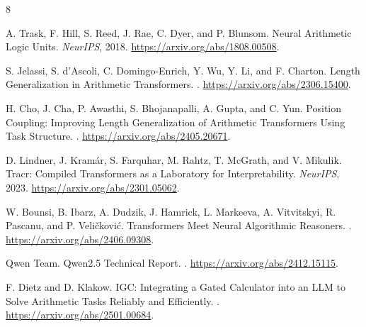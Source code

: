 \documentclass[11pt]{article}
\begin{document}
\begin{thebibliography}{8}

A. Trask, F. Hill, S. Reed, J. Rae, C. Dyer, and P. Blunsom.
\newblock Neural Arithmetic Logic Units.
\newblock \emph{NeurIPS}, 2018.
\newblock \url{https://arxiv.org/abs/1808.00508}.

S. Jelassi, S. d'Ascoli, C. Domingo-Enrich, Y. Wu, Y. Li, and F. Charton.
\newblock Length Generalization in Arithmetic Transformers.
.
\newblock \url{https://arxiv.org/abs/2306.15400}.

H. Cho, J. Cha, P. Awasthi, S. Bhojanapalli, A. Gupta, and C. Yun.
\newblock Position Coupling: Improving Length Generalization of Arithmetic
Transformers Using Task Structure.
.
\newblock \url{https://arxiv.org/abs/2405.20671}.

D. Lindner, J. Kram\'{a}r, S. Farquhar, M. Rahtz, T. McGrath, and V. Mikulik.
\newblock Tracr: Compiled Transformers as a Laboratory for Interpretability.
\newblock \emph{NeurIPS}, 2023.
\newblock \url{https://arxiv.org/abs/2301.05062}.

W. Bounsi, B. Ibarz, A. Dudzik, J. Hamrick, L. Markeeva, A. Vitvitskyi,
R. Pascanu, and P. Veli\v{c}kovi\'{c}.
\newblock Transformers Meet Neural Algorithmic Reasoners.
.
\newblock \url{https://arxiv.org/abs/2406.09308}.

Qwen Team.
\newblock Qwen2.5 Technical Report.
.
\newblock \url{https://arxiv.org/abs/2412.15115}.

F. Dietz and D. Klakow.
\newblock IGC: Integrating a Gated Calculator into an LLM to Solve Arithmetic
Tasks Reliably and Efficiently.
.
\newblock \url{https://arxiv.org/abs/2501.00684}.

\end{thebibliography}
\end{document}
